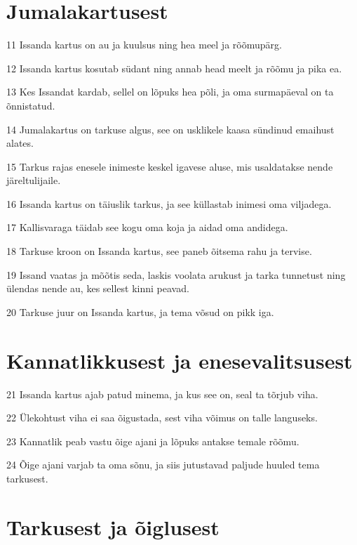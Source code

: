 \section*{Jumalakartusest}

\par 11 Issanda kartus on au ja kuulsus ning hea meel ja rõõmupärg.
\par 12 Issanda kartus kosutab südant ning annab head meelt ja rõõmu ja pika ea.
\par 13 Kes Issandat kardab, sellel on lõpuks hea põli, ja oma surmapäeval on ta õnnistatud.
\par 14 Jumalakartus on tarkuse algus, see on usklikele kaasa sündinud emaihust alates.
\par 15 Tarkus rajas enesele inimeste keskel igavese aluse, mis usaldatakse nende järeltulijaile.
\par 16 Issanda kartus on täiuslik tarkus, ja see küllastab inimesi oma viljadega.
\par 17 Kallisvaraga täidab see kogu oma koja ja aidad oma andidega.
\par 18 Tarkuse kroon on Issanda kartus, see paneb õitsema rahu ja tervise.
\par 19 Issand vaatas ja mõõtis seda, laskis voolata arukust ja tarka tunnetust ning ülendas nende au, kes sellest kinni peavad.
\par 20 Tarkuse juur on Issanda kartus, ja tema võsud on pikk iga.

\section*{Kannatlikkusest ja enesevalitsusest}

\par 21 Issanda kartus ajab patud minema, ja kus see on, seal ta tõrjub viha.
\par 22 Ülekohtust viha ei saa õigustada, sest viha võimus on talle languseks.
\par 23 Kannatlik peab vastu õige ajani ja lõpuks antakse temale rõõmu.
\par 24 Õige ajani varjab ta oma sõnu, ja siis jutustavad paljude huuled tema tarkusest.

\section*{Tarkusest ja õiglusest}

